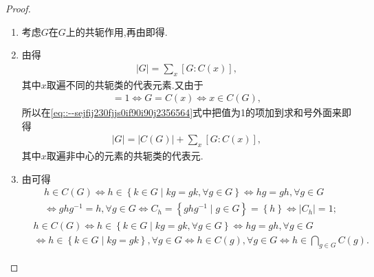 \documentclass[../../main.tex]{subfiles}%
\begin{document}
\begin{proof}
\begin{enumerate}[(1)]
\item 考虑$G$在$G$上的共轭作用,再由即得.

\item 由得
\begin{align}\label{eq::--sejfij230fjjs0if90i90j2356564}
|G| = \sum_{x}[G:C(x)],
\end{align}
其中$x$取遍不同的共轭类的代表元素.又由于
\begin{align*}
[G:C(x)] = 1 \iff G = C(x) \iff x \in C(G),
\end{align*}
所以在\eqref{eq::--sejfij230fjjs0if90i90j2356564}式中把值为1的项加到求和号外面来即得
\begin{align*}
|G| = |C(G)| + \sum_{x}[G:C(x)],
\end{align*}
其中$x$取遍非中心的元素的共轭类的代表元.

\item 由可得
\begin{align*}
&h\in C(G) \Longleftrightarrow h\in \left\{ k\in G\mid kg=gk,\forall g\in G \right\} \Longleftrightarrow hg=gh,\forall g\in G\\
&\Longleftrightarrow ghg^{-1}=h,\forall g\in G\Longleftrightarrow C_h=\left\{ ghg^{-1}\mid g\in G \right\} =\left\{ h \right\} \Longleftrightarrow |C_h|=1; 
\end{align*}
\begin{align*}
&h\in C(G) \Longleftrightarrow h\in \left\{ k\in G\mid kg=gk,\forall g\in G \right\} \Longleftrightarrow hg=gh,\forall g\in G \\
&\Longleftrightarrow h\in \left\{ k\in G\mid kg=gk \right\},\forall g\in G\Longleftrightarrow h\in C(g),\forall g\in G\Longleftrightarrow h\in \bigcap\limits_{g\in G}C(g).
\end{align*}
\end{enumerate}
\end{proof}
\end{document}
